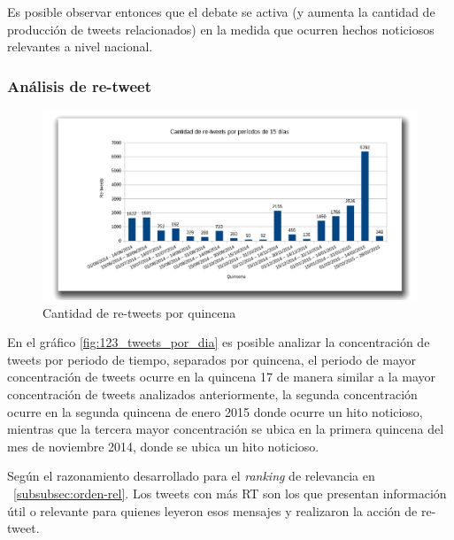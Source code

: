 Es posible observar entonces que el debate se activa (y aumenta la cantidad de producción de tweets relacionados) en la medida que ocurren hechos noticiosos relevantes a nivel nacional.

\subsubsection{Análisis de re-tweet}

\begin{figure}[H]
	\centering
	\includegraphics[width=1\textwidth]{imgs/123_cantidad_rt_por_quincena.png}
	\caption{Cantidad de re-tweets por quincena}
	\label{fig:123_cantidad_por_fecha}
\end{figure}

En el gráfico \ref{fig:123_tweets_por_dia} es posible analizar la concentración de tweets por periodo de tiempo, separados por quincena, el periodo de mayor concentración de tweets ocurre en la quincena 17 de manera similar a la mayor concentración de tweets analizados anteriormente, la segunda concentración ocurre en la segunda quincena de enero 2015  donde ocurre un hito noticioso, mientras que la tercera mayor concentración se ubica en la primera quincena del mes de noviembre 2014, donde se ubica un hito noticioso.

Según el razonamiento desarrollado para el \emph{ranking} de relevancia en ~\ref{subsubsec:orden-rel}. Los tweets con más RT son los que presentan información útil o relevante para quienes leyeron esos mensajes y realizaron la acción de re-tweet.

